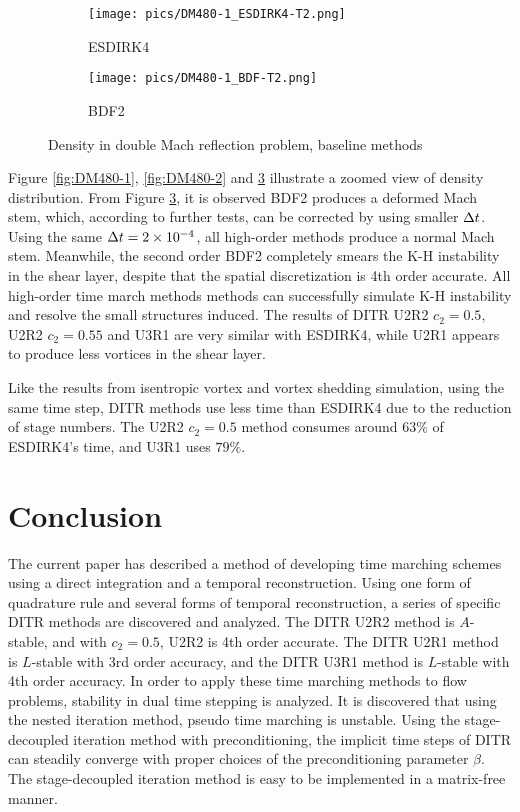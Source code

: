 \begin{figure}[htbp]
    \centering
    \begin{subfigure}{0.5\textwidth}
        \texttt{[image: pics/DM480-1\_ESDIRK4-T2.png]}
        \caption[]{ESDIRK4}
        \label{sfig:DM480_ESDIRK4}
    \end{subfigure}\hfill
    \begin{subfigure}{0.5\textwidth}
        \texttt{[image: pics/DM480-1\_BDF-T2.png]}
        \caption[]{BDF2}
        \label{sfig:DM480_BDF2}
    \end{subfigure}
    \caption{Density in double Mach reflection problem, baseline methods}
    \label{fig:DM480-3}
\end{figure}

Figure \ref{fig:DM480-1}, \ref{fig:DM480-2} and \ref{fig:DM480-3}
illustrate a zoomed view of density distribution.
From Figure \ref{fig:DM480-3},
it is observed BDF2 produces
a deformed Mach stem, which, according
to further tests, can be
corrected by using smaller ${\Delta} t$.
Using the same ${\Delta} t= 2\times10^{-4}$,
all high-order methods produce a
normal Mach stem.
Meanwhile, the second order BDF2
completely smears the K-H instability
in the shear layer, despite that the spatial
discretization is 4th order accurate.
All high-order time march methods methods can successfully
simulate K-H instability and resolve the
small structures induced.
The results of DITR U2R2 $c_2=0.5$, U2R2  $c_2=0.55$
and U3R1 are very similar with ESDIRK4, while U2R1
appears to produce less vortices in the shear layer.

Like the results from isentropic vortex and vortex shedding simulation,
using the same time step, DITR methods
use less time than ESDIRK4 due to the reduction of stage numbers.
The U2R2 $c_2=0.5$ method consumes around $63\%$ of ESDIRK4's time,
and U3R1 uses $79\%$.



\section{Conclusion}
\label{sec:Conc}

The current paper has described a method of
developing time marching schemes using a
direct integration and a temporal reconstruction.
Using one form of quadrature rule and several
forms of temporal reconstruction, a series of
specific DITR methods are discovered and analyzed.
The DITR U2R2 method is $A$-stable, and with $c_2=0.5$, U2R2 is 4th order accurate.
The DITR U2R1 method is $L$-stable with 3rd order accuracy, and
the DITR U3R1 method is $L$-stable with 4th order accuracy.
In order to apply these time marching methods to flow problems,
stability in dual time stepping is analyzed.
It is discovered that using the nested iteration method, pseudo time marching is unstable.
Using the stage-decoupled iteration method with preconditioning,
the implicit time steps of DITR can steadily converge with proper choices of
the preconditioning parameter $\beta$.
The stage-decoupled iteration method is easy to be implemented in a
matrix-free manner.

